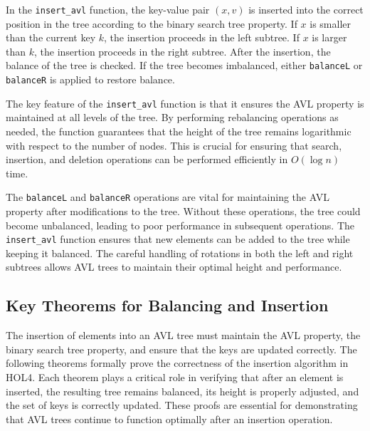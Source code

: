 \documentclass[12pt]{article}
\begin{document}
\begin{itemize}
\begin{description}
\begin{center}
\begin{tikzpicture}[node distance=2.5cm]
\end{tikzpicture}
\end{center}

  In the \texttt{insert\_avl} function, the key-value pair \( (x, v) \) is inserted into the correct position in the tree according to the binary search tree property. If \( x \) is smaller than the current key \( k \), the insertion proceeds in the left subtree. If \( x \) is larger than \( k \), the insertion proceeds in the right subtree. After the insertion, the balance of the tree is checked. If the tree becomes imbalanced, either \texttt{balanceL} or \texttt{balanceR} is applied to restore balance.

  The key feature of the \texttt{insert\_avl} function is that it ensures the AVL property is maintained at all levels of the tree. By performing rebalancing operations as needed, the function guarantees that the height of the tree remains logarithmic with respect to the number of nodes. This is crucial for ensuring that search, insertion, and deletion operations can be performed efficiently in \( O(\log n) \) time.

\end{description}

The \texttt{balanceL} and \texttt{balanceR} operations are vital for maintaining the AVL property after modifications to the tree. Without these operations, the tree could become unbalanced, leading to poor performance in subsequent operations. The \texttt{insert\_avl} function ensures that new elements can be added to the tree while keeping it balanced. The careful handling of rotations in both the left and right subtrees allows AVL trees to maintain their optimal height and performance.


\subsection{Key Theorems for Balancing and Insertion}

The insertion of elements into an AVL tree must maintain the AVL property, the binary search tree property, and ensure that the keys are updated correctly. The following theorems formally prove the correctness of the insertion algorithm in HOL4. Each theorem plays a critical role in verifying that after an element is inserted, the resulting tree remains balanced, its height is properly adjusted, and the set of keys is correctly updated. These proofs are essential for demonstrating that AVL trees continue to function optimally after an insertion operation.


\end{itemize}
\end{document}
